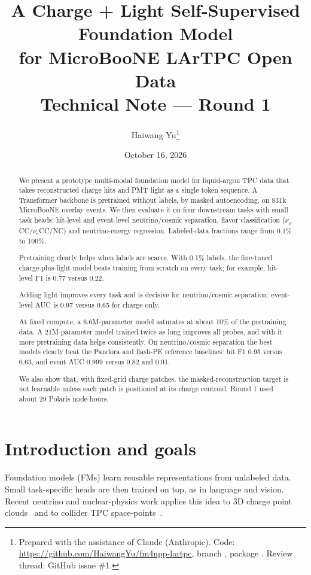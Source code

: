 \documentclass[11pt,a4paper]{article}
\title{\textbf{A Charge + Light Self-Supervised Foundation Model\\ for MicroBooNE LArTPC Open Data}\\[4pt]
\large Technical Note --- Round 1}
\author{Haiwang Yu\thanks{Prepared with the assistance of Claude (Anthropic). Code: \url{https://github.com/HaiwangYu/fm4npp-lartpc}, branch \code{round1-prototype}, package \code{multi-modal-qlmatch/qlfm}. Review thread: GitHub issue \#1.}}
\date{October 16, 2026}
\begin{document}
\maketitle

\begin{abstract}
\noindent
We present a prototype multi-modal foundation model for liquid-argon TPC data that takes reconstructed charge hits and PMT light as a single token sequence. A Transformer backbone is pretrained without labels, by masked autoencoding, on 831k MicroBooNE overlay events. We then evaluate it on four downstream tasks with small task heads: hit-level and event-level neutrino/cosmic separation, flavor classification ($\nu_\mu$CC/$\nu_e$CC/NC) and neutrino-energy regression. Labeled-data fractions range from 0.1\% to 100\%.

Pretraining clearly helps when labels are scarce. With 0.1\% labels, the fine-tuned charge-plus-light model beats training from scratch on every task; for example, hit-level F1 is 0.77 versus 0.22.

Adding light improves every task and is decisive for neutrino/cosmic separation: event-level AUC is 0.97 versus 0.65 for charge only.

At fixed compute, a 6.6M-parameter model saturates at about 10\% of the pretraining data. A 21M-parameter model trained twice as long improves all probes, and with it more pretraining data helps consistently. On neutrino/cosmic separation the best models clearly beat the Pandora and flash-PE reference baselines: hit F1 0.95 versus 0.63, and event AUC 0.999 versus 0.82 and 0.91.

We also show that, with fixed-grid charge patches, the masked-reconstruction target is not learnable unless each patch is positioned at its charge centroid. Round 1 used about 29 Polaris node-hours.
\end{abstract}

\tableofcontents
\vspace{6pt}

\section{Introduction and goals}
Foundation models (FMs) learn reusable representations from unlabeled data. Small task-specific heads are then trained on top, as in language and vision. Recent neutrino and nuclear-physics work applies this idea to 3D charge point clouds~\cite{polarmae,panda,pandav2} and to collider TPC space-points~\cite{fm4npp}.
\end{document}
